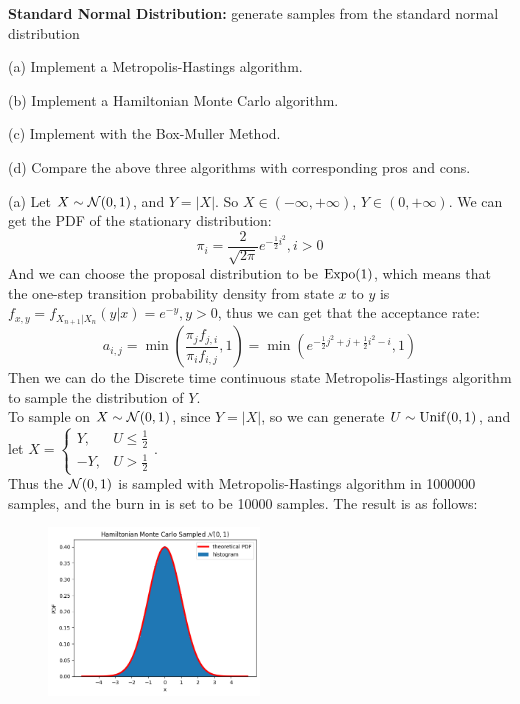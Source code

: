 \begin{homeworkProblem}

\textbf{Standard Normal Distribution:} generate samples from the standard normal distribution

(a) Implement a Metropolis-Hastings algorithm.

(b) Implement a Hamiltonian Monte Carlo algorithm.

(c) Implement with the Box-Muller Method.

(d) Compare the above three algorithms with corresponding pros and cons.

\solution

(a) Let $X\sim \mathcal{N}(0,1)$, and $Y=|X|$. So $X\in (-\infty,+\infty)$, $Y\in (0,+\infty)$. We can get the PDF of the stationary distribution:
$$\pi_i=\dfrac{2}{\sqrt{2\pi}}e^{-\frac{1}{2}i^2},i>0$$
And we can choose the proposal distribution to be $\operatorname{Expo}(1)$, which means that the one-step transition probability density from state $x$ to $y$ is $f_{x,y}=f_{X_{n+1}|X_n}(y|x)=e^{-y},y>0$, thus we can get that the acceptance rate:
$$a_{i,j}=\min\left(\dfrac{\pi_jf_{j,i}}{\pi_if_{i,j}},1\right)=\min\left(e^{-\frac{1}{2}j^2+j+\frac{1}{2}i^2-i},1\right)$$
Then we can do the Discrete time continuous state Metropolis-Hastings algorithm to sample the distribution of $Y$. \\
To sample on $X\sim \mathcal{N}(0,1)$, since $Y=|X|$, so we can generate $U\sim\operatorname{Unif}(0,1)$, and let $X=\begin{cases}
    Y, & U\leq \frac{1}{2} \\
    -Y, & U>\frac{1}{2}
\end{cases}$. \\
Thus the $\mathcal{N}(0,1)$ is sampled with Metropolis-Hastings algorithm in 1000000 samples, and the burn in is set to be 10000 samples. The result is as follows:
\begin{figure}[h]
    \centering
    \includegraphics[width=0.5\textwidth]{./figure/p4/MH.png}
\end{figure}


\end{homeworkProblem}
